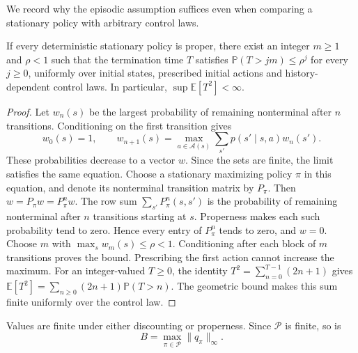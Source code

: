 We record why the episodic assumption suffices even when comparing a stationary policy with arbitrary control laws.
\begin{lemma}\label{lem: uniform termination}
If every deterministic stationary policy is proper, there exist an integer $m\ge1$ and $\rho<1$ such that the termination time $T$ satisfies $\mathbb P(T>jm)\le\rho^j$ for every $j\ge0$, uniformly over initial states, prescribed initial actions and history-dependent control laws. In particular, $\sup\mathbb E[T^2]<\infty$.
\end{lemma}
\begin{proof}
Let $w_n(s)$ be the largest probability of remaining nonterminal after $n$ transitions. Conditioning on the first transition gives
\[
w_0(s)=1,\qquad w_{n+1}(s)=\max_{a\in\mathcal A(s)}\sum_{s'}p(s'\mid s,a)w_n(s').
\]
These probabilities decrease to a vector $w$. Since the sets are finite, the limit satisfies the same equation. Choose a stationary maximizing policy $\pi$ in this equation, and denote its nonterminal transition matrix by $P_\pi$. Then $w=P_\pi w=P_\pi^n w$. The row sum $\sum_{s'}P_\pi^n(s,s')$ is the probability of remaining nonterminal after $n$ transitions starting at $s$. Properness makes each such probability tend to zero. Hence every entry of $P_\pi^n$ tends to zero, and $w=0$. Choose $m$ with $\max_s w_m(s)\le\rho<1$. Conditioning after each block of $m$ transitions proves the bound. Prescribing the first action cannot increase the maximum. For an integer-valued $T\ge0$, the identity $T^2=\sum_{n=0}^{T-1}(2n+1)$ gives $\mathbb E[T^2]=\sum_{n\ge0}(2n+1)\mathbb P(T>n)$. The geometric bound makes this sum finite uniformly over the control law.
\end{proof}

Values are finite under either discounting or properness. Since $\mathcal P$ is finite, so is
\begin{equation}\label{eq: target bound}
B=\max_{\pi\in\mathcal P}\|q_\pi\|_\infty.
\end{equation}

